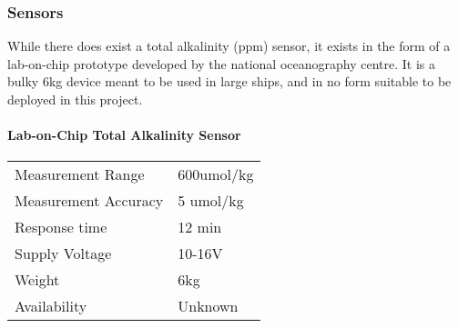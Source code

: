 
\subsubsection{Sensors}

While there does exist a total alkalinity (ppm) sensor, it exists in the form of a lab-on-chip prototype developed by the national oceanography centre. \cite{alkalinitysensor} It is a bulky 6kg device meant to be used in large ships, and in no form suitable to be deployed in this project.

\paragraph{Lab-on-Chip Total Alkalinity Sensor}\mbox{} \cite{alkalinitysensor}
\begin{table}[h!]
	\centering
	\quad
	\begin{tabular}{| l | l |}
    \hline
    Measurement Range & 600umol/kg \\
    Measurement Accuracy &  5 umol/kg \\
    Response time & 12 min \\
    Supply Voltage & 10-16V \\
    Weight & 6kg \\
    Availability & Unknown \\
    \hline
	\end{tabular}
\end{table}